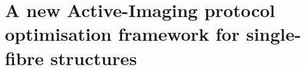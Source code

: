 \chapter{A new Active-Imaging protocol optimisation framework for single-fibre structures}
\label{chapter7}
\glsresetall %

%

